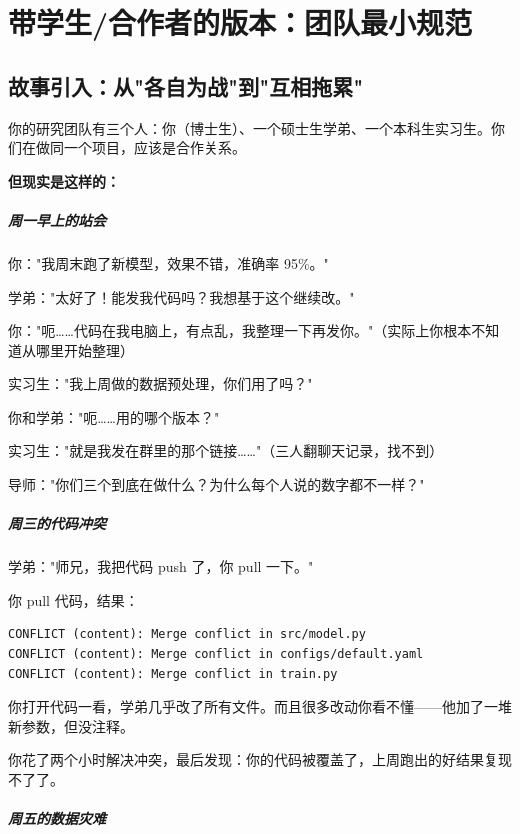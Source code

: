 \chapter{带学生/合作者的版本：团队最小规范}
\label{ch:team}

\section{故事引入：从"各自为战"到"互相拖累"}

你的研究团队有三个人：你（博士生）、一个硕士生学弟、一个本科生实习生。你们在做同一个项目，应该是合作关系。

\textbf{但现实是这样的：}

\paragraph{周一早上的站会}

你："我周末跑了新模型，效果不错，准确率 95\%。"

学弟："太好了！能发我代码吗？我想基于这个继续改。"

你："呃……代码在我电脑上，有点乱，我整理一下再发你。"（实际上你根本不知道从哪里开始整理）

实习生："我上周做的数据预处理，你们用了吗？"

你和学弟："呃……用的哪个版本？"

实习生："就是我发在群里的那个链接……"（三人翻聊天记录，找不到）

导师："你们三个到底在做什么？为什么每个人说的数字都不一样？"

\paragraph{周三的代码冲突}

学弟："师兄，我把代码 push 了，你 pull 一下。"

你 pull 代码，结果：
\begin{verbatim}
CONFLICT (content): Merge conflict in src/model.py
CONFLICT (content): Merge conflict in configs/default.yaml
CONFLICT (content): Merge conflict in train.py
\end{verbatim}

你打开代码一看，学弟几乎改了所有文件。而且很多改动你看不懂——他加了一堆新参数，但没注释。

你花了两个小时解决冲突，最后发现：你的代码被覆盖了，上周跑出的好结果复现不了了。

\paragraph{周五的数据灾难}

